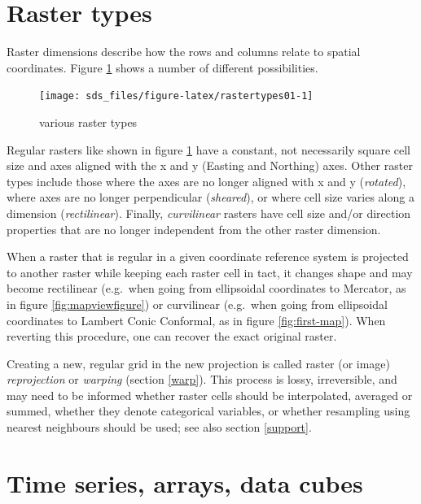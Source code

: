 \documentclass[]{book}
\begin{document}
\hypertarget{raster-types}{%
\section{Raster types}\label{raster-types}}

Raster dimensions describe how the rows and columns relate to
spatial coordinates. Figure \ref{fig:rastertypes01} shows a number
of different possibilities.

\begin{figure}

{\centering \texttt{[image: sds\_files/figure-latex/rastertypes01-1]} 

}

\caption{various raster types}\label{fig:rastertypes01}
\end{figure}

Regular rasters like shown in figure \ref{fig:rastertypes01} have a constant,
not necessarily square cell size and axes aligned with the x and y
(Easting and Northing) axes. Other raster types include those
where the axes are no longer aligned with x and y (\emph{rotated}),
where axes are no longer perpendicular (\emph{sheared}), or where cell
size varies along a dimension (\emph{rectilinear}). Finally, \emph{curvilinear}
rasters have cell size and/or direction properties that are no longer
independent from the other raster dimension.

When a raster that is regular in a given coordinate reference
system is projected to another raster while keeping each raster
cell in tact, it changes shape and may become rectilinear
(e.g.~when going from ellipsoidal coordinates to Mercator, as in
figure \ref{fig:mapviewfigure}) or curvilinear (e.g.~when going from
ellipsoidal coordinates to Lambert Conic Conformal, as in figure
\ref{fig:first-map}). When reverting this procedure, one can recover
the exact original raster.

Creating a new, regular grid in the new projection is called raster
(or image) \emph{reprojection} or \emph{warping} (section \ref{warp}). This
process is lossy, irreversible, and may need to be informed whether
raster cells should be interpolated, averaged or summed, whether
they denote categorical variables, or whether resampling using
nearest neighbours should be used; see also section \ref{support}.

\hypertarget{time-series-arrays-data-cubes}{%
\section{Time series, arrays, data cubes}\label{time-series-arrays-data-cubes}}
\end{document}
